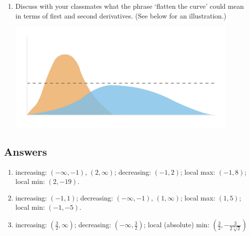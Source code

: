 \begin{enumerate}
\begin{enumerate}
\smallskip

\item  Discuss with your classmates what the phrase  `flatten the curve' could mean in terms of first and second derivatives.  (See below for an illustration.)


\smallskip

\centerline{\includegraphics[width = 4.5in]{./AppDerivativesGraphics/flattenthecurve.jpeg}}


\end{enumerate}




\setcounter{HW}{\value{enumi}}
\end{enumerate}

\newpage

\subsection{Answers}

\begin{enumerate}

\item increasing:  $(-\infty, -1)$, $(2, \infty)$;  decreasing:  $(-1,2)$;  local max:  $(-1,8)$;  local min:  $(2, -19)$.

\smallskip

\item increasing:  $(-1,1)$;  decreasing:  $(-\infty, -1)$, $(1, \infty)$;  local max:  $(1,5)$;  local min:  $(-1, -5)$.

\smallskip

\item increasing:  $\left( \frac{3}{2}, \infty\right)$; decreasing:  $\left( -\infty, \frac{3}{2}\right)$;  local (absolute) min:  $\left(\frac{3}{2}, -\frac{3}{2 \sqrt[3]{2}}\right)$

\smallskip

\setcounter{HW}{\value{enumi}}
\end{enumerate}

